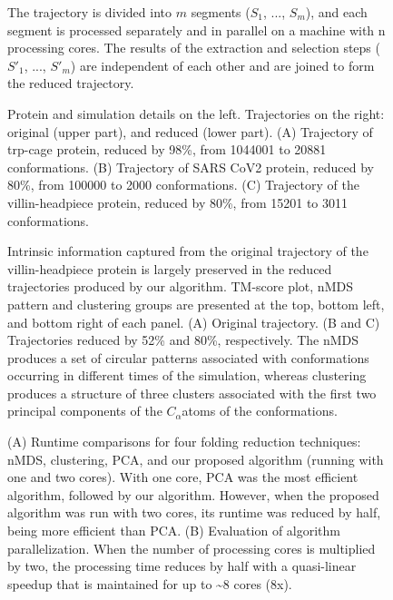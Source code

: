 \documentclass[twocolumn]{bmcart}%
\begin{document}
\begin{backmatter}
\begin{figure}[th]
\caption{ The trajectory is divided into $m$ segments ($S_{1}$, ..., $S_{m}$), and each segment is processed separately and in parallel on a machine with n processing cores. The results of the extraction and selection steps ($S'_{1}$, ..., $S'_{m}$) are independent of each other and are joined to form the reduced trajectory.\label{fig:Algorithm-Parallel}}
\end{figure}


\begin{figure}[!t]
\caption{ Protein and simulation details on the left. Trajectories on the right: original (upper part), and reduced (lower part). (A) Trajectory of trp-cage protein, reduced by 98\%, from 1044001 to 20881 conformations. (B) Trajectory of SARS CoV2 protein, reduced by 80\%, from 100000 to 2000 conformations. (C) Trajectory of the villin-headpiece protein, reduced by 80\%, from 15201 to 3011 conformations. \label{fig:Trajectory-Results}}
\end{figure}

\begin{figure}[!th]
\caption{ Intrinsic information captured from the original trajectory of the villin-headpiece protein is largely preserved in the reduced trajectories produced by our algorithm. TM-score plot, nMDS pattern and clustering groups are presented at the top, bottom left, and bottom right of each panel. (A) Original trajectory. (B and C) Trajectories reduced by 52\% and 80\%, respectively. The nMDS produces a set of circular patterns associated with conformations occurring in different times of the simulation, whereas clustering produces a structure of three clusters associated with the first two principal components of the $C_{\alpha}$atoms of the conformations. \label{fig:Comparaciones-PCA-nMDS}}
\end{figure}

\begin{figure}[th]
\caption{ (A) Runtime comparisons for four folding reduction techniques: nMDS, clustering, PCA, and our proposed algorithm (running with one and two cores). With one core, PCA was the most efficient algorithm, followed by our algorithm. However, when the proposed algorithm was run with two cores, its runtime was reduced by half, being more efficient than PCA. (B) Evaluation of algorithm parallelization. When the number of processing cores is multiplied by two, the processing time reduces by half with a quasi-linear speedup that is maintained for up to \textasciitilde{}8 cores (8x). \label{fig:Performance-methods}}
\end{figure}


\end{backmatter}
\end{document}
